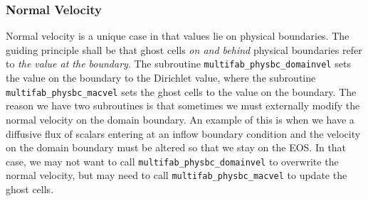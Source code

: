 \documentclass[final]{siamltex}
\begin{document}
\subsubsection{Normal Velocity}

Normal velocity is a unique case in that values lie on physical boundaries.
The guiding principle shall be that ghost cells 
{\it on and behind} physical boundaries refer to {\it the value at the boundary}.
The subroutine {\tt multifab\_physbc\_domainvel} sets the value on the boundary to the Dirichlet
value, where the subroutine {\tt multifab\_physbc\_macvel} sets the ghost cells to the value
on the boundary.  The reason we have two subroutines is that sometimes we must externally modify
the normal velocity on the domain boundary.  An example of this is when we have a diffusive flux
of scalars entering at an inflow boundary condition and the velocity on the domain boundary must
be altered so that we stay on the EOS.  In that case, we may not want to call
{\tt multifab\_physbc\_domainvel} to overwrite the normal velocity, but may need to call
{\tt multifab\_physbc\_macvel} to update the ghost cells.
\end{document}
